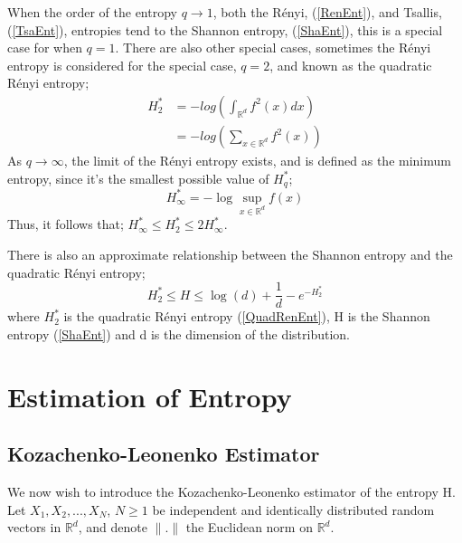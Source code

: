 \documentclass{article}
\begin{document}
When the order of the entropy $q \to 1$, both the R\'enyi, (\ref{RenEnt}), and Tsallis, (\ref{TsaEnt}), entropies tend to the Shannon entropy, (\ref{ShaEnt}), this is a special case for when $q=1$. There are also other special cases, sometimes the R\'enyi entropy is considered for the special case, $q=2$, and known as the quadratic R\'enyi entropy;
\begin{align} \label{QuadRenEnt}
H_{2}^{*} &= - log\left( \int_{\mathbb{R}^{d}} f^2(x) dx \right)\\
&= - log \left( \sum_{x \in \mathbb{R}^d} f^2 (x) \right)
\end{align}
As $q \to \infty$, the limit of the R\'enyi entropy exists, and is defined as the minimum entropy, since it's the smallest possible value of $H_{q}^{*}$;
\begin{equation}
H_{\infty}^{*} = - \log \sup_{x \in \mathbb{R}^d} f (x)
\end{equation}
Thus, it follows that; $H_{\infty}^{*} \leq H_{2}^{*} \leq 2H_{\infty}^{*}$.

There is also an approximate relationship between the Shannon entropy and the quadratic R\'enyi entropy;
\begin{equation}
H_{2}^{*} \leq H \leq \log(d) + \frac{1}{d} - e^{-H_{2}^{*}}
\end{equation}
where $H_{2}^{*}$ is the quadratic R\'enyi entropy (\ref{QuadRenEnt}), H is the Shannon entropy (\ref{ShaEnt}) and d is the dimension of the distribution.

\section{Estimation of Entropy}

\subsection{Kozachenko-Leonenko Estimator}

We now wish to introduce the Kozachenko-Leonenko estimator of the entropy H. Let $X_{1}, X_{2}, ... ,X_{N}$, $N \geq 1$ be independent and identically distributed random vectors in $\mathbb{R}^{d}$, and denote $\|.\|$ the Euclidean norm on $\mathbb{R}^{d}$.
 
\end{document}
